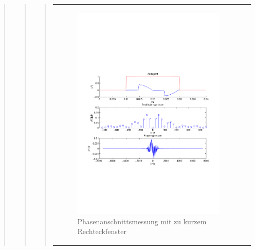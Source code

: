 \begin{quote}
\begin{quote}
\begin{quote}
\begin{center}
\begin{tabular}{ll}
\begin{minipage}{0.6\textwidth}
                    \end{minipage}
                    \begin{minipage}{0.6\textwidth}
    
                         \begin{figure}[H]
                            \label{fig:}
                            \includegraphics[scale=0.4, trim = 1.5cm 7cm 1.5cm 8cm,
                            clip]{./Bilder/Phasenanschnittsmessungmitrechteckfensterleckeffekt} %
                            \caption{Phasenanschnittsmessung mit zu kurzem Rechteckfenster}
                        \end{figure}
                   \vspace{-1.5em}
    
                    \end{minipage}
    

\end{tabular}
\end{center}
\end{quote}
\end{quote}
\end{quote}
